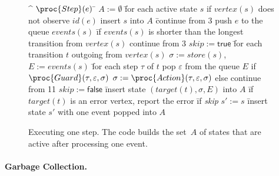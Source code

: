 \documentclass[10pt, preprint]{sigplanconf} %
\begin{document}
\begin{figure*}[t]
\begin{center}
\begin{alg}
\^  $\proc{Step}(e)$
\=  $A := \emptyset$
\=  for each active state $s$
\+    if $\mathit{vertex}(s)$ does not observe $\mathit{id}(e)$
\+      insert $s$ into $A$
\=      continue from $3$
\-    push $e$ to the queue $\mathit{events}(s)$
\=    if $\mathit{events}(s)$ is shorter than the longest transition from $\mathit{vertex}(s)$
\+      continue from $3$
\1    $\mathit{skip}:=\mathsf{true}$
\=    for each transition $t$ outgoing from $\mathit{vertex}(s)$
\+      $\sigma := \mathit{store}(s)$,\quad $E := \mathit{events}(s)$
\=      for each step $\tau$ of $t$
\+        pop $\varepsilon$ from the queue $E$
\+        if $\proc{Guard}(\tau, \varepsilon, \sigma)$
\+          $\sigma := \proc{Action}(\tau, \varepsilon, \sigma)$
\-        else
\+          continue from 11
\2      $\mathit{skip}:=\mathsf{false}$
\=      insert state $(\mathit{target}(t), \sigma, E)$ into $A$
\=      if $\mathit{target}(t)$ is an error vertex, report the error
\=      if \textit{skip}
\+        $s' := s$
\=        insert state $s'$ with one event popped into $A$
\end{alg}
\bigskip
\caption{
  Executing one step.
  The code builds the set~$A$ of states that are active after processing one event.
}
\label{fig:checker.step}
\end{center}
\end{figure*}

\paragraph{Garbage Collection.}

\end{document}
